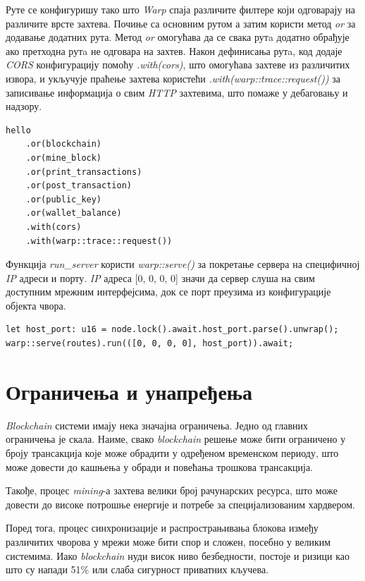 \documentclass[12pt, a4paper]{article}
\begin{document}
Руте се конфигуришу тако што \textit{Warp} спаја различите филтере који одговарају на различите врсте захтева. Почиње са основним рутом а затим користи метод \textit{or} за додавање додатних рута. Метод \textit{or} омогућава да се свака рутa додатно обрађује ако претходна рутa не одговара на захтев. Након дефинисања рутa, код додаје \textit{CORS} конфигурацију помоћу \textit{.with(cors)}, што омогућава захтеве из различитих извора, и укључује праћење захтева користећи \textit{.with(warp::trace::request())} за записивање информација о свим \textit{HTTP} захтевима, што помаже у дебаговању и надзору.

\begin{verbatim}
hello
    .or(blockchain)
    .or(mine_block)
    .or(print_transactions)
    .or(post_transaction)
    .or(public_key)
    .or(wallet_balance)
    .with(cors)
    .with(warp::trace::request())
\end{verbatim}

Функција \textit{run\_server} користи \textit{warp::serve()} за покретање сервера на специфичној \textit{IP} адреси и порту. \textit{IP} адреса [0, 0, 0, 0] значи да сервер слуша на свим доступним мрежним интерфејсима, док се порт преузима из конфигурације објекта чвора.

\begin{verbatim}
let host_port: u16 = node.lock().await.host_port.parse().unwrap();
warp::serve(routes).run(([0, 0, 0, 0], host_port)).await;
\end{verbatim}

\newpage
\section{Ограничења и унапређења}
\textit{Blockchain} системи имају нека значајна ограничења. Једно од главних ограничења је скала. Наиме, свако \textit{blockchain} решење може бити ограничено у броју трансакција које може обрадити у одређеном временском периоду, што може довести до кашњења у обради и повећања трошкова трансакција. 

Такође, процес \textit{mining}-а захтева велики број рачунарских ресурса, што може довести до високе потрошње енергије и потребе за специјализованим хардвером.

Поред тога, процес синхронизације и распрострањивања блокова између различитих чворова у мрежи може бити спор и сложен, посебно у великим системима. Иако \textit{blockchain} нуди висок ниво безбедности, постоје и ризици као што су напади 51\% или слаба сигурност приватних кључева.
\end{document}
